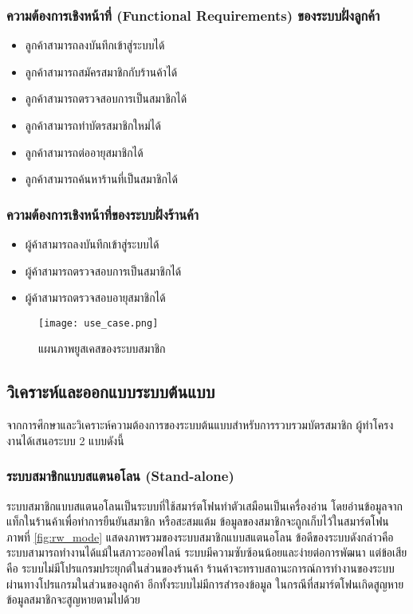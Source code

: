 \documentclass[a4paper]{article}
\begin{document}
\subsubsection{ความต้องการเชิงหน้าที่ (Functional Requirements) ของระบบฝั่งลูกค้า}
\begin{itemize}
	\item ลูกค้าสามารถลงบันทึกเข้าสู่ระบบได้
	\item ลูกค้าสามารถสมัครสมาชิกกับร้านค้าได้
	\item ลูกค้าสามารถตรวจสอบการเป็นสมาชิกได้
	\item ลูกค้าสามารถทำบัตรสมาชิกใหม่ได้
	\item ลูกค้าสามารถต่ออายุสมาชิกได้
	\item ลูกค้าสามารถค้นหาร้านที่เป็นสมาชิกได้
\end{itemize}

\subsubsection{ความต้องการเชิงหน้าที่ของระบบฝั่งร้านค้า}
\begin{itemize}
	\item ผู้ค้าสามารถลงบันทึกเข้าสู่ระบบได้
	\item ผู้ค้าสามารถตรวจสอบการเป็นสมาชิกได้
	\item ผู้ค้าสามารถตรวจสอบอายุสมาชิกได้
\end{itemize}

\begin{figure}[ht!]
\centering
\texttt{[image: use\_case.png]}
\caption{แผนภาพยูสเคสของระบบสมาชิก} \label{fig:usecase}
\label{overflow}
\end{figure}

\subsection{วิเคราะห์และออกแบบระบบต้นแบบ}

จากการศึกษาและวิเคราะห์ความต้องการของระบบต้นแบบสำหรับการรวบรวมบัตรสมาชิก ผู้ทำโครงงานได้เสนอระบบ 2 แบบดังนี้

\subsubsection{ระบบสมาชิกแบบสแตนอโลน (Stand-alone)}
ระบบสมาชิกแบบสแตนอโลนเป็นระบบที่ใช้สมาร์ตโฟนทำตัวเสมือนเป็นเครื่องอ่าน โดยอ่านข้อมูลจากแท็กในร้านค้าเพื่อทำการยืนยันสมาชิก หรือสะสมแต้ม ข้อมูลของสมาชิกจะถูกเก็บไว้ในสมาร์ตโฟน ภาพที่ \ref{fig:rw_mode} แสดงภาพรวมของระบบสมาชิกแบบสแตนอโลน ข้อดีของระบบดังกล่าวคือ ระบบสามารถทำงานได้แม้ในสภาวะออฟไลน์ ระบบมีความซับซ้อนน้อยและง่ายต่อการพัฒนา แต่ข้อเสียคือ ระบบไม่มีโปรแกรมประยุกต์ในส่วนของร้านค้า ร้านค้าจะทราบสถานะการณ์การทำงานของระบบผ่านทางโปรแกรมในส่วนของลูกค้า อีกทั้งระบบไม่มีการสำรองข้อมูล ในกรณีที่สมาร์ตโฟนเกิดสูญหาย ข้อมูลสมาชิกจะสูญหายตามไปด้วย
\end{document}
